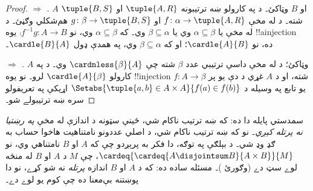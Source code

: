 \documentclass[../../../include/open-logic-section]{subfiles}
\begin{document}
\begin{proof}
\emph{ $\Rightarrow$ .}
$A$ او $B$ وټاکئ۔ د  په کارولو
ښه ترتيبونه $\tuple{A, R}$ او $\tuple{B, S}$
شته۔ د
له مخې $f \colon
\alpha \to \tuple{A, R}$ او $g \colon \beta \to \tuple{B, S}$
هم‌شکلي وګڼئ۔ د
 له مخې
يا $\alpha \subseteq \beta$ وي يا
$\beta \subseteq \alpha$ وي۔ که
$\alpha \subseteq \beta$ وي، نو
$\comp{f^{-1}}{g} \colon A \to B$ يوه
!!a{injection} ده، نو $\cardle{A}{B}$؛ او که
$\beta \subseteq \alpha$ وي، په همدې ډول
$\cardle{B}{A}$۔

\emph{ $\Rightarrow$ .}
$A$ وټاکئ؛ د  له مخې داسې
ترتيبي عدد $\beta$ شته چې
$\cardnless{\beta}{A}$ وي۔ د
 په کارولو
$\cardle{A}{\beta}$ لرو۔ نو يوه
!!{injection} $f \colon A \to
\beta$ شته، او د $A$ غړي د دې يو پر يو تابع په وسيله
د $\Setabs{\tuple{a, b} \in A \times A}{f(a)
\in f(b)}$ اړيکې په تعريفولو سره ښه ترتيبولے شو۔
\end{proof}
\noindent
سمدستي پايله دا ده: که ښه ترتيب ناکام شي، ځينې سټونه
د اندازې له مخې \emph{په رښتيا نه پرتله کېږي}۔ نو که
ښه ترتيب ناکام شي، د اصلي عددونو نامتناهيت هاخوا حساب
به ګډ وډ شي۔ د بېلګې په توګه، دا فکر به پرېږدو چې
که $A$ او $B$ نامتناهي وي، نو
$\cardeq{\cardeq{A \disjointsum B}{A \times
B}}{M}$، چې $M$ د $A$ او $B$ له منځه لوے
سټ دے (وګورئ
)۔
مسئله ساده ده: که د $A$ او $B$ اندازه
\emph{پرتله} نه شو کړے، نو دا پوښتنه بې‌معنا ده
چې کوم يو لوے دے۔
\end{document}

